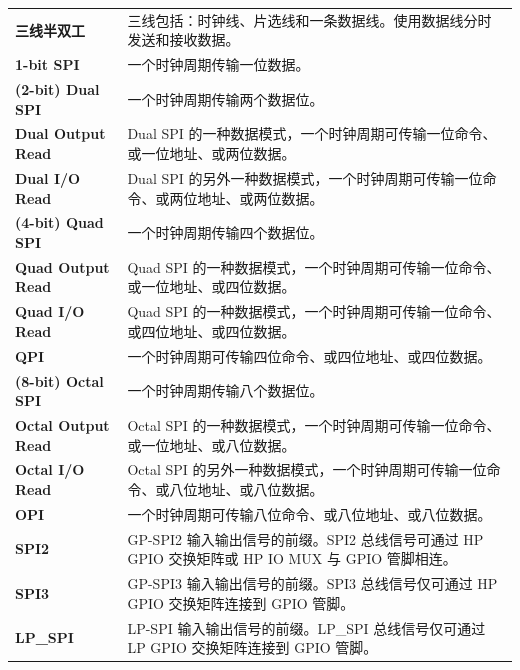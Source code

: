 \begin{longtable}[c]{ R{4cm} p{10cm} }
\textbf{三线半双工} & 三线包括：时钟线、片选线和一条数据线。使用数据线分时发送和接收数据。\\
\textbf{1-bit SPI} & 一个时钟周期传输一位数据。\\ 
\textbf{(2-bit) Dual SPI} & 一个时钟周期传输两个数据位。\\
\textbf{Dual Output Read} & Dual SPI 的一种数据模式，一个时钟周期可传输一位命令、或一位地址、或两位数据。\\
\textbf{Dual I/O Read} & Dual SPI 的另外一种数据模式，一个时钟周期可传输一位命令、或两位地址、或两位数据。\\
\textbf{(4-bit) Quad SPI} & 一个时钟周期传输四个数据位。\\
\textbf{Quad Output Read} & Quad SPI 的一种数据模式，一个时钟周期可传输一位命令、或一位地址、或四位数据。\\
\textbf{Quad I/O Read} & Quad SPI 的一种数据模式，一个时钟周期可传输一位命令、或四位地址、或四位数据。\\
\textbf{QPI} & 一个时钟周期可传输四位命令、或四位地址、或四位数据。\\
\textbf{(8-bit) Octal SPI} & 一个时钟周期传输八个数据位。 \\
\textbf{Octal Output Read} & Octal SPI 的一种数据模式，一个时钟周期可传输一位命令、或一位地址、或八位数据。\\
\textbf{Octal I/O Read} & Octal SPI 的另外一种数据模式，一个时钟周期可传输一位命令、或八位地址、或八位数据。\\
\textbf{OPI} & 一个时钟周期可传输八位命令、或八位地址、或八位数据。\\
\textbf{SPI2} & GP-SPI2 输入输出信号的前缀。SPI2 总线信号可通过 HP GPIO 交换矩阵或 HP IO MUX 与 GPIO 管脚相连。\\
\textbf{SPI3} & GP-SPI3 输入输出信号的前缀。SPI3 总线信号仅可通过 HP GPIO 交换矩阵连接到 GPIO 管脚。\\
\textbf{LP\_SPI} & LP-SPI 输入输出信号的前缀。LP\_SPI 总线信号仅可通过 LP GPIO 交换矩阵连接到 GPIO 管脚。
\end{longtable}
